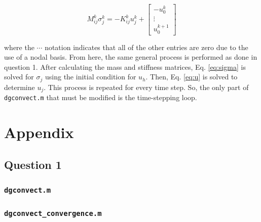 \documentclass[10pt]{article}
\newcommand{\beq}{\begin{equation}}
\newcommand{\eeq}{\end{equation}}
\begin{document}
\beq
\label{eq:sigma}
M_{ij}^k\sigma_j^k=-K_{ij}^ku_j^k+\begin{bmatrix}-u_0^k\\\vdots\\u_0^{k+1}\end{bmatrix}
\eeq

where the \(\cdots\) notation indicates that all of the other entries are zero due to the use of a nodal basis. From here, the same general process is performed as done in question 1. After calculating the mass and stiffness matrices, Eq. \eqref{eq:sigma} is solved for \(\sigma_j\) using the initial condition for \(u_h\). Then, Eq. \eqref{eq:u} is solved to determine \(u_j\). This process is repeated for every time step. So, the only part of {\tt dgconvect.m} that must be modified is the time-stepping loop.



\section{Appendix}
\subsection{Question 1}
\subsubsection{{\tt dgconvect.m}}

\subsubsection{{\tt dgconvect\_convergence.m}}

\end{document}
